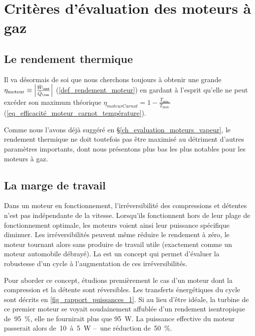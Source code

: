 \section{Critères d’évaluation des moteurs à gaz}
\label{ch_criteres_evaluation_moteurs_gaz}

	\subsection{Le rendement thermique}

		Il va désormais de soi que nous cherchons toujours à obtenir une grande  $\eta_\text{moteur} \equiv \left| \frac{\dot{W}_\net}{\dot{Q}_\inn} \right|$ (\ref{def_rendement_moteur}) en gardant à l’esprit qu’elle ne peut excéder son maximum théorique $\eta _{moteur Carnot} = 1 - \frac{T_\text{min.}}{T_\text{max.}}$ (\ref{eq_efficacité_moteur_carnot_température}).

		Comme nous l’avons déjà suggéré en \S\ref{ch_evaluation_moteurs_vapeur}, le rendement thermique ne doit toutefois pas être maximisé au détriment d’autres paramètres importants, dont nous présentons plus bas les plus notables pour les moteurs à gaz.

	\subsection{La marge de travail}
	\label{ch_rapport_des_puissances}

		Dans un moteur en fonctionnement, l’irréversibilité des compressions et détentes n’est pas indépendante de la vitesse. Lorsqu’ils fonctionnent hors de leur plage de fonctionnement optimale, les moteurs voient ainsi leur puissance spécifique diminuer. Les irréversibilités peuvent même réduire le rendement à zéro, le moteur tournant alors sans produire de travail utile (exactement comme un moteur automobile débrayé). La  est un concept qui permet d’évaluer la robustesse d’un cycle à l’augmentation de ces irréversibilités.

		Pour aborder ce concept, étudions premièrement le cas d’un moteur dont la compression et la détente sont réversibles. Les transferts énergétiques du cycle sont décrits en \cref{fig_rapport_puissances_1}. Si au lieu d’être idéale, la turbine de ce premier moteur se voyait soudainement affublée d’un rendement isentropique de~\SI{95}{\percent}, elle ne fournirait plus que \SI{95}{\watt}. La puissance effective du moteur passerait alors de~\num{10}~à~\SI{5}{\watt} --\ une réduction de~\SI{50}{\percent}.

